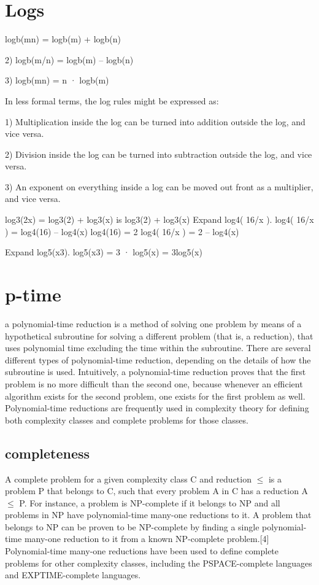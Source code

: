 \documentclass[10 pt]{article}
\begin{document}
\section{Logs}

\begin{multicols}{2}
logb(mn) = logb(m) + logb(n)

2) logb(m/n) = logb(m) – logb(n)

3) logb(mn) = n · logb(m)

In less formal terms, the log rules might be expressed as:

1) Multiplication inside the log can be turned into addition outside the log, and vice versa.

2) Division inside the log can be turned into subtraction outside the log, and vice versa.

3) An exponent on everything inside a log can be moved out front as a multiplier, and vice versa.



log3(2x) = log3(2) + log3(x) is log3(2) + log3(x)
Expand log4( 16/x ).
log4( 16/x ) = log4(16) – log4(x)
log4(16) = 2
log4( 16/x ) = 2 – log4(x)

Expand log5(x3).  
log5(x3) = 3 · log5(x) = 3log5(x)

\end{multicols}

\section{p-time}
a polynomial-time reduction is a method of solving one problem by means of a hypothetical subroutine for solving a different problem (that is, a reduction), that uses polynomial time excluding the time within the subroutine. There are several different types of polynomial-time reduction, depending on the details of how the subroutine is used. Intuitively, a polynomial-time reduction proves that the first problem is no more difficult than the second one, because whenever an efficient algorithm exists for the second problem, one exists for the first problem as well. Polynomial-time reductions are frequently used in complexity theory for defining both complexity classes and complete problems for those classes.

\subsection{completeness}
A complete problem for a given complexity class C and reduction $\leq$ is a problem P that belongs to C, such that every problem A in C has a reduction A $\leq$ P. For instance, a problem is NP-complete if it belongs to NP and all problems in NP have polynomial-time many-one reductions to it. A problem that belongs to NP can be proven to be NP-complete by finding a single polynomial-time many-one reduction to it from a known NP-complete problem.[4] Polynomial-time many-one reductions have been used to define complete problems for other complexity classes, including the PSPACE-complete languages and EXPTIME-complete languages.
\end{document}
